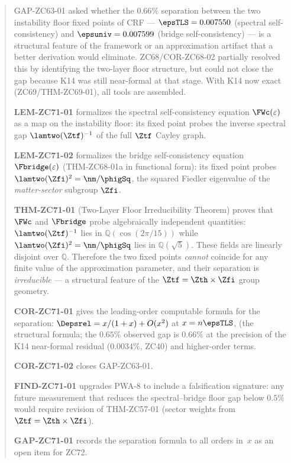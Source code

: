 \documentclass[12pt, a4paper]{article}
\begin{document}
\begin{abstract}
\sloppy
GAP-ZC63-01 asked whether the $0.66\%$ separation between the
two instability floor fixed points of CRF ---
$\epsTLS = 0.007550$ (spectral self-consistency) and
$\epsuniv = 0.007599$ (bridge self-consistency) ---
is a structural feature of the framework or an approximation
artifact that a better derivation would eliminate.
ZC68/COR-ZC68-02 partially resolved this by identifying the
two-layer floor structure, but could not close the gap because
K14 was still near-formal at that stage.
With K14 now exact (ZC69/THM-ZC69-01), all tools are assembled.

\textbf{LEM-ZC71-01} formalizes the spectral self-consistency
equation $\FWc(\varepsilon)$ as a map on the instability floor:
its fixed point probes the inverse spectral gap
$\lamtwo(\Ztf)^{-1}$ of the full $\Ztf$ Cayley graph.

\textbf{LEM-ZC71-02} formalizes the bridge self-consistency
equation $\Fbridge(\varepsilon)$ (THM-ZC68-01a in functional form):
its fixed point probes $\lamtwo(\Zfi)^{2} = \nm/\phigSq$,
the squared Fiedler eigenvalue of the \emph{matter-sector}
subgroup $\Zfi$.

\textbf{THM-ZC71-01} (Two-Layer Floor Irreducibility Theorem)
proves that $\FWc$ and $\Fbridge$ probe algebraically independent
quantities: $\lamtwo(\Ztf)^{-1}$ lies in $\mathbb{Q}(\cos(2\pi/15))$
while $\lamtwo(\Zfi)^{2} = \nm/\phigSq$ lies in $\mathbb{Q}(\sqrt{5})$.
These fields are linearly disjoint over $\mathbb{Q}$.
Therefore the two fixed points \emph{cannot} coincide for any
finite value of the approximation parameter, and their
separation is \emph{irreducible} --- a structural feature of
the $\Ztf = \Zth \times \Zfi$ group geometry.

\textbf{COR-ZC71-01} gives the leading-order computable formula
for the separation:
$\Depsrel = x/(1+x) + O(x^2)$ at $x = n\epsTLS$,
(the structural formula; the $0.65\%$ observed gap is
$0.66\%$ at the precision of the K14 near-formal residual ($0.0034\%$,
ZC40) and higher-order terms.

\textbf{COR-ZC71-02} closes GAP-ZC63-01.

\textbf{FIND-ZC71-01} upgrades PWA-8 to include a falsification
signature: any future measurement that reduces the spectral--bridge
floor gap below $0.5\%$ would require revision of THM-ZC57-01
(sector weights from $\Ztf = \Zth \times \Zfi$).

\textbf{GAP-ZC71-01} records the separation formula to all
orders in~$x$ as an open item for ZC72.
\end{abstract}
\end{document}
